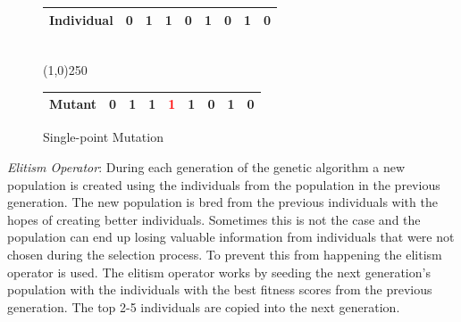 \begin{figure}[H]
  \centering
  \begin{tabular}{ | p{2cm} | l | l | l | l | l | l | l | l | }
    \hline
    Individual & 0 & 1 & 1 & 0 & 1 & 0 & 1 & 0 \\
    \hline
  \end{tabular}
  \\
  \vspace{3 mm}
  \line(1,0){250}
  \\
  \vspace{3 mm}
  \begin{tabular}{ | p{2cm} | l | l | l | l | l | l | l | l | }
    \hline
    Mutant & 0 & 1 & 1 & \textcolor{red}{1} & 1 & 0 & 1 & 0 \\
    \hline
  \end{tabular}
  \caption{Single-point Mutation}
  \label{fig:mutation}
\end{figure}

\textit{Elitism Operator}: During each generation of the genetic algorithm a new population is created using the individuals from the population in the previous generation. The new population is bred from the previous individuals with the hopes of creating better individuals. Sometimes this is not the case and the population can end up losing valuable information from individuals that were not chosen during the selection process. To prevent this from happening the elitism operator is used. The elitism operator works by seeding the next generation's population with the individuals with the best fitness scores from the previous generation. The top 2-5 individuals are copied into the next generation.